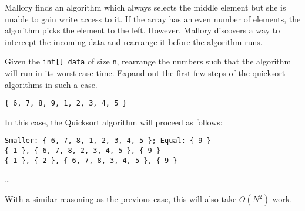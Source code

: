 \begin{blocksection}
\question Mallory finds an algorithm which always selects the middle element
but she is unable to gain write access to it. If the array has an even number
of elements, the algorithm picks the element to the left. However, Mallory
discovers a way to intercept the incoming data and rearrange it before the
algorithm runs.

Given the \lstinline$int[] data$ of size \lstinline$n$, rearrange the numbers
such that the algorithm will run in its worst-case time. Expand out the first
few steps of the quicksort algorithms in such a case.

\begin{solution}[1in]
\begin{verbatim}
{ 6, 7, 8, 9, 1, 2, 3, 4, 5 }
\end{verbatim}

In this case, the Quicksort algorithm will proceed as follows:

\begin{verbatim}
Smaller: { 6, 7, 8, 1, 2, 3, 4, 5 }; Equal: { 9 }
{ 1 }, { 6, 7, 8, 2, 3, 4, 5 }, { 9 }
{ 1 }, { 2 }, { 6, 7, 8, 3, 4, 5 }, { 9 }
\end{verbatim}
\ldots

With a similar reasoning as the previous case, this will also take $O(N^2)$
work.
\end{solution}
\end{blocksection}
